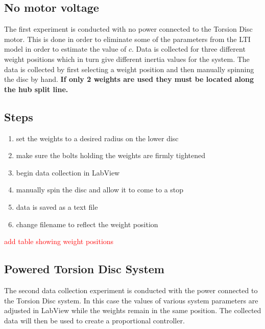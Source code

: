 \documentclass[11pt,titlepage]{article}
\begin{document}
	\subsection{No motor voltage}
		The first experiment is conducted with no power connected to the Torsion Disc motor. This is done in order to eliminate some of the parameters from the LTI model in order to estimate the value of $c$. Data is collected for three different weight positions which in turn give different inertia values for the system. The data is collected by first selecting a weight position and then manually spinning the disc by hand. \textbf{If only 2 weights are used they must be located along the hub split line.}
	\subsection*{Steps}
		\begin{enumerate}
			\item set the weights to a desired radius on the lower disc
			\item make sure the bolts holding the weights are firmly tightened
			\item begin data collection in LabView
			\item manually spin the disc and allow it to come to a stop
			\item data is saved as a text file
			\item change filename to reflect the weight position
		\end{enumerate}
			\textcolor{red}{add table showing weight positions}
	\subsection{Powered Torsion Disc System}
	The second data collection experiment is conducted with the power connected to the Torsion Disc system. In this case the values of various system parameters are adjusted in LabView while the weights remain in the same position. The collected data will then be used to create a proportional controller.
\end{document}
